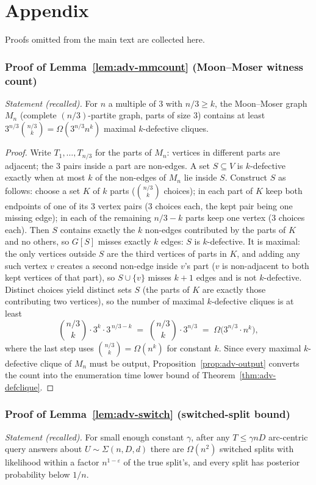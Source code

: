 \section{Appendix}
\label{sec:adv-appendix}

Proofs omitted from the main text are collected here.

\subsubsection*{Proof of Lemma~\ref{lem:adv-mmcount} (Moon--Moser witness count)}
{\itshape Statement (recalled).} For $n$ a multiple of $3$ with $n/3 \ge k$, the Moon--Moser
graph $M_n$ (complete $(n/3)$-partite graph, parts of size $3$) contains at least
$3^{n/3}\binom{n/3}{k} = \Omega(3^{n/3} n^k)$ maximal $k$-defective cliques.\eop

\begin{proof}
Write $T_1,\dots,T_{n/3}$ for the parts of $M_n$: vertices in different parts are adjacent;
the $3$ pairs inside a part are non-edges. A set $S \subseteq V$ is $k$-defective exactly when
at most $k$ of the non-edges of $M_n$ lie inside $S$. Construct $S$ as follows: choose a set
$K$ of $k$ parts ($\binom{n/3}{k}$ choices); in each part of $K$ keep both endpoints of one of
its $3$ vertex pairs ($3$ choices each, the kept pair being one missing edge); in each of the
remaining $n/3-k$ parts keep one vertex ($3$ choices each). Then $S$ contains exactly the $k$
non-edges contributed by the parts of $K$ and no others, so $G[S]$ misses exactly $k$ edges:
$S$ is $k$-defective. It is maximal: the only vertices outside $S$ are the third vertices of
parts in $K$, and adding any such vertex $v$ creates a second non-edge inside $v$'s part
($v$ is non-adjacent to both kept vertices of that part), so $S \cup \{v\}$ misses $k+1$
edges and is not $k$-defective. Distinct choices yield distinct sets $S$ (the parts of $K$ are
exactly those contributing two vertices), so the number of maximal $k$-defective cliques is at
least
\[
\binom{n/3}{k}\cdot 3^{k}\cdot 3^{\,n/3-k}
\;=\; \binom{n/3}{k}\cdot 3^{n/3}
\;=\; \Omega\bigl(3^{n/3}\cdot n^{k}\bigr),
\]
where the last step uses $\binom{n/3}{k} = \Omega(n^k)$ for constant $k$. Since every maximal
$k$-defective clique of $M_n$ must be output, Proposition~\ref{prop:adv-output} converts the
count into the enumeration time lower bound of Theorem~\ref{thm:adv-defclique}.
\end{proof}

\subsubsection*{Proof of Lemma~\ref{lem:adv-switch} (switched-split bound)}
{\itshape Statement (recalled).} For small enough constant $\gamma$, after any
$T \le \gamma n D$ arc-centric query answers about $U \sim \Sigma(n,D,d)$ there are
$\Omega(n^2)$ switched splits with likelihood within a factor $n^{1-\varepsilon}$ of the true
split's, and every split has posterior probability below $1/n$.\eop

